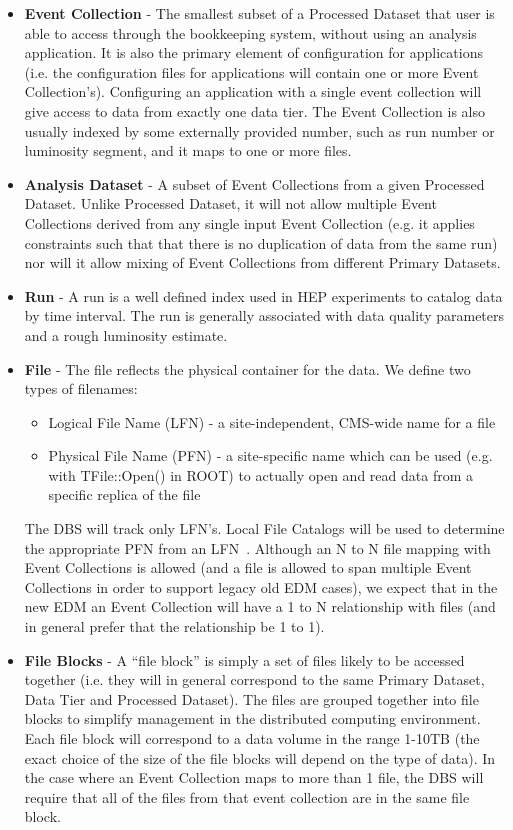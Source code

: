 \documentclass[pdftex]{cmspaper}
\begin{document}
\begin{itemize}
\item{\bf Event Collection} - The smallest subset of a Processed Dataset that
user is able to access through the bookkeeping system, without using an
analysis application. It is also the primary element of configuration for
applications (i.e. the configuration files for applications will contain
one or more Event Collection's). Configuring an application with a single
event collection will give access to data from exactly one data tier. The 
Event Collection is also usually indexed by some externally provided number, 
such as run number or luminosity segment, and it maps to one or more files. 

\item {\bf Analysis Dataset} - A subset of Event Collections from a given 
Processed Dataset. Unlike Processed Dataset, it will not allow multiple Event 
Collections derived from any single input Event Collection (e.g. it applies
constraints such that that there is no duplication of data from the same 
run) nor will it allow mixing of Event Collections from different Primary 
Datasets.

\item {\bf Run} - A run is a well defined index used in HEP experiments to 
catalog data by time interval. The run is generally associated with data
quality parameters and a rough luminosity estimate.

\item {\bf File} - The file reflects the physical container for the data. We 
define two types of filenames:
    \begin{itemize}
    \item Logical File Name (LFN) - a site-independent, CMS-wide name for
          a file
    \item Physical File Name (PFN) - a site-specific name which can be used
          (e.g. with TFile::Open() in ROOT) to actually open and read data
          from a specific replica of the file
    \end{itemize}
The DBS will track only LFN's. Local File Catalogs will be used to determine
the appropriate PFN from an LFN~\cite{CTDR}.
Although an N to N file mapping with Event Collections is allowed (and a file 
is allowed to span multiple Event Collections in order to support legacy old
EDM cases), we expect that in the new EDM an Event Collection will have a 1 to
N relationship with files (and in general prefer that the relationship be
1 to 1). 

\item {\bf File Blocks} - A ``file block'' is simply a set of files
likely to be accessed together (i.e. they will in general correspond to
the same Primary Dataset, Data Tier and Processed Dataset). The files are 
grouped together into file blocks to simplify management in the distributed 
computing environment. Each file block will correspond to a data volume in 
the range 1-10TB (the exact choice of the size of the file blocks will depend 
on the type of data). In the case where an Event Collection maps to more than
1 file, the DBS will require that all of the files from that event collection
are in the same file block.

\end{itemize} 
\end{document}
